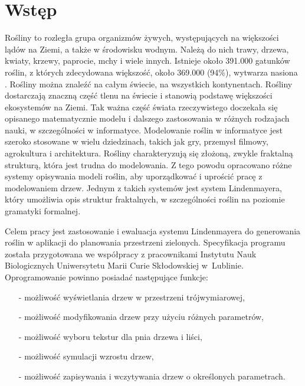 \documentclass[a4paper,12pt,twoside]{book} %
\begin{document}
\sloppy
\thispagestyle{empty}

\newpage{}

\thispagestyle{empty}
\newpage{}

\tableofcontents{}

\chapter*{Wstęp} 

Rośliny to rozległa grupa organizmów żywych, występujących na większości 
lądów na Ziemi, a także w środowisku wodnym. 
Należą do nich trawy, drzewa, kwiaty, krzewy, paprocie, mchy i wiele innych.
Istnieje około 391.000 gatunków roślin, z których zdecydowana większość,
około 369.000 (94\%), wytwarza nasiona \cite{howmanyplants}. Rośliny można znaleźć na 
całym świecie, na wszystkich kontynentach. Rośliny dostarczają znaczną część 
tlenu na świecie i stanowią podstawę
większości ekosystemów na Ziemi. Tak ważna część świata rzeczywistego
doczekała się opisanego matematycznie modelu i dalszego zastosowania w różnych rodzajach nauki, w
szczególności w informatyce. Modelowanie roślin w informatyce
jest szeroko stosowane w wielu dziedzinach, takich jak gry, przemysł filmowy, 
agrokultura i architektura. Rośliny charakteryzują się złożoną,
zwykle fraktalną strukturą, która jest trudna do modelowania.
Z tego powodu opracowano różne systemy opisywania modeli roślin,
aby uporządkować i uprościć pracę z modelowaniem drzew. Jednym z
takich systemów jest system Lindenmayera, który umożliwia opis struktur 
fraktalnych, w szczególności roślin na poziomie gramatyki formalnej.




Celem pracy jest zastosowanie i ewaluacja systemu Lindenmayera do generowania 
roślin w aplikacji do planowania przestrzeni zielonych. Specyfikacja programu 
została przygotowana we współpracy z pracownikami Instytutu Nauk Biologicznych 
Uniwersytetu Marii Curie Skłodowskiej w~Lublinie. Oprogramowanie powinno posiadać 
następujące funkcje:

\begin{itemize}
\setlength\itemsep{-0.4em}
\item[-] możliwość wyświetlania drzew w przestrzeni trójwymiarowej,
\item[-] możliwość modyfikowania drzew przy użyciu różnych parametrów,
\item[-] możliwość wyboru tekstur dla pnia drzewa i liści,
\item[-] możliwość symulacji wzrostu drzew,
\item[-] możliwość zapisywania i wczytywania drzew o określonych parametrach.

\end{itemize}
\end{document}
